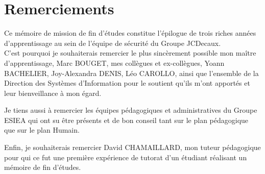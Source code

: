 

\chapter*{Remerciements}
Ce mémoire de mission de fin d'études constitue l'épilogue de trois riches années d'apprentissage au sein de l'équipe de
sécurité du Groupe JCDecaux.\\
C'est pourquoi je souhaiterais remercier le plus sincèrement possible mon maître d'apprentissage, Marc BOUGET, mes collègues 
et ex-collègues, Yoann BACHELIER, Joy-Alexandra DENIS, Léo CAROLLO, ainsi que l'ensemble de la
Direction des Systèmes d'Information pour le soutient qu'ils m'ont apportés et leur bienveillance à mon égard.

Je tiens aussi à remercier les équipes pédagogiques et administratives du Groupe ESIEA qui ont su être présents et de bon conseil 
tant sur le plan pédagogique que sur le plan Humain.

Enfin, je souhaiterais remercier David CHAMAILLARD, mon tuteur pédagogique pour qui ce fut une première expérience de tutorat d'un
étudiant réalisant un mémoire de fin d'études.

